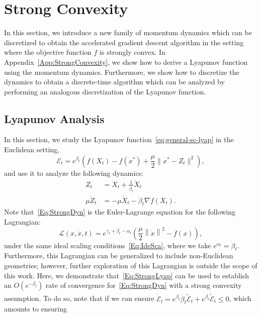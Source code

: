 \documentclass[11pt]{article}
\theoremstyle{plain}
\newcommand{\E}{{\mathcal E}}
\begin{document}
\section{Strong Convexity}
In this section, we introduce a new family of momentum dynamics which can be discretized to obtain the accelerated gradient descent algorithm in the setting where the objective function $f$ is strongly convex. In Appendix~\ref{App:StrongConvexity}, we show how to derive a Lyapunov function using the momentum dynamics. Furthermore, we show how to discretize the dynamics to obtain a discrete-time algorithm which can be analyzed by performing an analogous discretization of the Lyapunov function. 
\label{Sec:StrongConv}
\subsection{Lyapunov Analysis}
In this section, we study the Lyapunov function~\eqref{eq:general-sc-lyap} in the Euclidean setting,
\begin{equation}\label{Eq:StrongLyap}
\E_t = e^{\beta_t}\left(f(X_t) - f(x^\ast) + \frac{\mu}{2}\|x^\ast- Z_t \|^2\right),
\end{equation}
and use it to analyze the following dynamics: 
\begin{subequations}\label{Eq:StrongDyn}
\begin{align}
Z_t &= X_t + \frac{1}{\dot \beta_t} \dot X_t\\
\mu \dot Z_t &= - \mu\dot X_t - \dot \beta_t \nabla f(X_t).
\end{align}
\end{subequations}
Note that~\eqref{Eq:StrongDyn} is the Euler-Lagrange equation for the following Lagrangian:
\begin{equation}\label{Eq:LagStrongConv}
\mathcal{L}(x, \dot x, t) = e^{\gamma_t + \beta_t - \alpha_t}  \left(\frac{\mu}{2}\left\|\dot x\right\|^2 - f(x)\right),
\end{equation}
under the same ideal scaling conditions~\eqref{Eq:IdeSca}, where we take $e^{\alpha_t} = \dot \beta_t$. Furthermore, this Lagrangian can be generalized to include non-Euclidean geometries; however, further exploration of this Lagrangian is outside the scope of this work. Here, we demonstrate that~\eqref{Eq:StrongLyap} can be used to establish an $O(e^{-\beta_t})$ rate of convergence for~\eqref{Eq:StrongDyn} with a strong convexity assumption. To do so, note that if we can ensure  $\dot \E_t = e^{\beta_t}\dot \beta_t \tilde{\E}_t + e^{\beta_t} \dot{\tilde{\E}}_t \leq 0$, which amounts to ensuring
\end{document}

